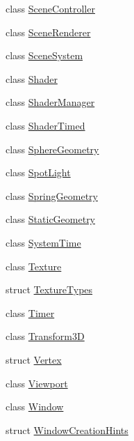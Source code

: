 \begin{DoxyCompactItemize}
class \mbox{\hyperlink{classec_1_1_scene_controller}{Scene\+Controller}}
\item 
class \mbox{\hyperlink{classec_1_1_scene_renderer}{Scene\+Renderer}}
\item 
class \mbox{\hyperlink{classec_1_1_scene_system}{Scene\+System}}
\item 
class \mbox{\hyperlink{classec_1_1_shader}{Shader}}
\item 
class \mbox{\hyperlink{classec_1_1_shader_manager}{Shader\+Manager}}
\item 
class \mbox{\hyperlink{classec_1_1_shader_timed}{Shader\+Timed}}
\item 
class \mbox{\hyperlink{classec_1_1_sphere_geometry}{Sphere\+Geometry}}
\item 
class \mbox{\hyperlink{classec_1_1_spot_light}{Spot\+Light}}
\item 
class \mbox{\hyperlink{classec_1_1_spring_geometry}{Spring\+Geometry}}
\item 
class \mbox{\hyperlink{classec_1_1_static_geometry}{Static\+Geometry}}
\item 
class \mbox{\hyperlink{classec_1_1_system_time}{System\+Time}}
\item 
class \mbox{\hyperlink{classec_1_1_texture}{Texture}}
\item 
struct \mbox{\hyperlink{structec_1_1_texture_types}{Texture\+Types}}
\item 
class \mbox{\hyperlink{classec_1_1_timer}{Timer}}
\item 
class \mbox{\hyperlink{classec_1_1_transform3_d}{Transform3D}}
\item 
struct \mbox{\hyperlink{structec_1_1_vertex}{Vertex}}
\item 
class \mbox{\hyperlink{classec_1_1_viewport}{Viewport}}
\item 
class \mbox{\hyperlink{classec_1_1_window}{Window}}
\item 
struct \mbox{\hyperlink{structec_1_1_window_creation_hints}{Window\+Creation\+Hints}}
\end{DoxyCompactItemize}
